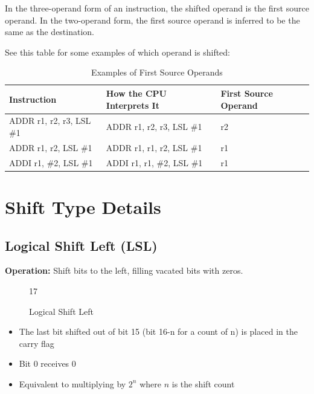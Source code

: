 In the three-operand form of an instruction, the shifted operand is the first source operand. In the two-operand form,
the first source operand is inferred to be the same as the destination.

See this table for some examples of which operand is shifted:

\begin{table}[H]
	\centering
	\begin{tabular}{lll}
		\toprule
		\textbf{Instruction}     & \textbf{How the CPU Interprets It} & \textbf{First Source Operand} \\
		\midrule
		ADDR r1, r2, r3, LSL \#1 & ADDR r1, r2, r3, LSL \#1           & r2                            \\
		ADDR r1, r2, LSL \#1     & ADDR r1, r1, r2, LSL \#1           & r1                            \\
		ADDI r1, \#2, LSL \#1    & ADDI r1, r1, \#2, LSL \#1          & r1                            \\
		\bottomrule
	\end{tabular}
	\caption{Examples of First Source Operands}
	\label{tab:source-operand-examples}
\end{table}

\section{Shift Type Details}

\subsection{Logical Shift Left (LSL)}

\textbf{Operation:} Shift bits to the left, filling vacated bits with zeros.

\begin{figure}[H]
	\centering
	\begin{bytefield}[bitwidth=1.2em]{17}
		 \\
	\end{bytefield}
	\caption{Logical Shift Left}
\end{figure}

\begin{itemize}
	\item The last bit shifted out of bit 15 (bit 16-n for a count of n) is placed in the carry flag
	\item Bit 0 receives 0
	\item Equivalent to multiplying by $2^n$ where $n$ is the shift count
\end{itemize}

